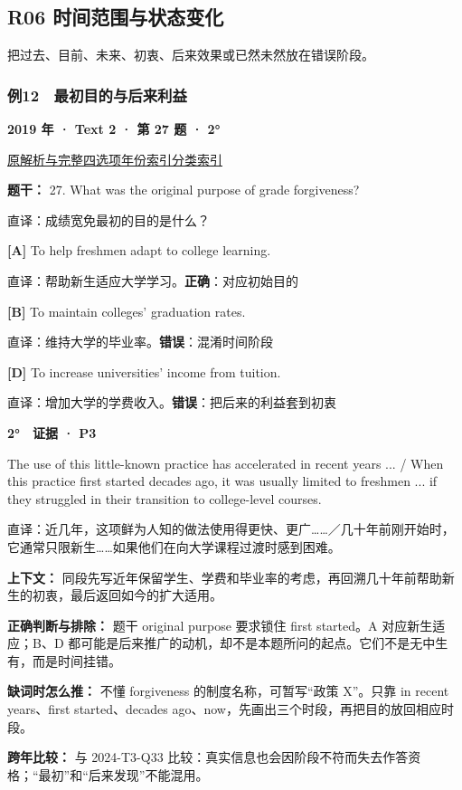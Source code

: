 \documentclass[11pt,a4paper]{article}
\begin{document}
\subsection{R06 时间范围与状态变化}
把过去、目前、未来、初衷、后来效果或已然未然放在错误阶段。

\subsubsection{例12　最初目的与后来利益}\label{case-2019-T2-Q27}
\noindent\textbf{2019 年 · Text 2 · 第 27 题 · 2°}\par\noindent \href{https://zj139.github.io/math-notes/english/107ec057655f55ef9ad0ea14/\#q27}{原解析与完整四选项}\quad \hyperref[idx-2019-T2-Q27]{年份索引}\quad \hyperref[class-R06]{分类索引}\par\smallskip
\noindent\textbf{题干：} 27. What was the original purpose of grade forgiveness?\par\smallskip
直译：成绩宽免最初的目的是什么？

\noindent\textbf{[A]} To help freshmen adapt to college learning.\par\nopagebreak
\noindent 直译：帮助新生适应大学学习。\quad\textbf{正确}：对应初始目的\par\smallskip
{}\noindent\textbf{[B]} To maintain colleges’ graduation rates.\par\nopagebreak
\noindent 直译：维持大学的毕业率。\quad\textbf{错误}：混淆时间阶段\par\smallskip
{}\noindent\textbf{[D]} To increase universities’ income from tuition.\par\nopagebreak
\noindent 直译：增加大学的学费收入。\quad\textbf{错误}：把后来的利益套到初衷\par\smallskip
\begin{evidence}\textbf{2°　证据 · P3}\par The use of this little-known practice has accelerated in recent years ... / When this practice first started decades ago, it was usually limited to freshmen ... if they struggled in their transition to college-level courses.\par 直译：近几年，这项鲜为人知的做法使用得更快、更广……／几十年前刚开始时，它通常只限新生……如果他们在向大学课程过渡时感到困难。\end{evidence}
\noindent\textbf{上下文：} 同段先写近年保留学生、学费和毕业率的考虑，再回溯几十年前帮助新生的初衷，最后返回如今的扩大适用。\par\smallskip
\noindent\textbf{正确判断与排除：} 题干 original purpose 要求锁住 first started。A 对应新生适应；B、D 都可能是后来推广的动机，却不是本题所问的起点。它们不是无中生有，而是时间挂错。\par\smallskip
\noindent\textbf{缺词时怎么推：} 不懂 forgiveness 的制度名称，可暂写“政策 X”。只靠 in recent years、first started、decades ago、now，先画出三个时段，再把目的放回相应时段。\par\smallskip
\noindent\textbf{跨年比较：} 与 2024-T3-Q33 比较：真实信息也会因阶段不符而失去作答资格；“最初”和“后来发现”不能混用。\par\smallskip
\clearpage
\end{document}

